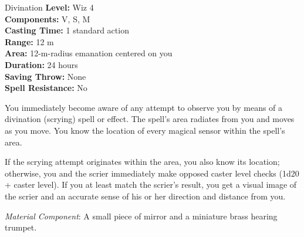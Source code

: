 {Divination}
{
	\textbf{Level:}
	Wiz 4\\
	\textbf{Components:}
	V, S, M\\
	\textbf{Casting Time:}
	1 standard action\\
	\textbf{Range:}
	12 m\\
	\textbf{Area:}
	12-m-radius emanation centered on you\\
	\textbf{Duration:}
	24 hours\\
	\textbf{Saving Throw:}
	None\\
	\textbf{Spell Resistance:}
	No\\
}
{
	You immediately become aware of any attempt to observe you by means of a divination (scrying) spell or effect. The spell's area radiates from you and moves as you move. You know the location of every magical sensor within the spell's area.

	If the scrying attempt originates within the area, you also know its location; otherwise, you and the scrier immediately make opposed caster level checks (1d20 + caster level). If you at least match the scrier's result, you get a visual image of the scrier and an accurate sense of his or her direction and distance from you.

	\textit{Material Component}:
	A small piece of mirror and a miniature brass hearing trumpet.

}

